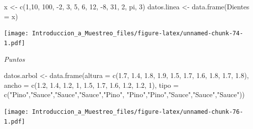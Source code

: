\documentclass[
]{book}
\newenvironment{Shaded}{\begin{snugshade}}{\end{snugshade}}
\newcommand{\AttributeTok}[1]{\textcolor[rgb]{0.77,0.63,0.00}{#1}}
\newcommand{\DecValTok}[1]{\textcolor[rgb]{0.00,0.00,0.81}{#1}}
\newcommand{\FloatTok}[1]{\textcolor[rgb]{0.00,0.00,0.81}{#1}}
\newcommand{\FunctionTok}[1]{\textcolor[rgb]{0.00,0.00,0.00}{#1}}
\newcommand{\NormalTok}[1]{#1}
\newcommand{\OtherTok}[1]{\textcolor[rgb]{0.56,0.35,0.01}{#1}}
\newcommand{\SpecialCharTok}[1]{\textcolor[rgb]{0.00,0.00,0.00}{#1}}
\newcommand{\StringTok}[1]{\textcolor[rgb]{0.31,0.60,0.02}{#1}}
\begin{document}
\begin{Shaded}
\begin{Highlighting}[]
\NormalTok{x }\OtherTok{\textless{}{-}} \FunctionTok{c}\NormalTok{(}\DecValTok{1}\NormalTok{,}\DecValTok{10}\NormalTok{, }\DecValTok{100}\NormalTok{, }\SpecialCharTok{{-}}\DecValTok{2}\NormalTok{, }\DecValTok{3}\NormalTok{, }\DecValTok{5}\NormalTok{, }\DecValTok{6}\NormalTok{, }\DecValTok{12}\NormalTok{, }\SpecialCharTok{{-}}\DecValTok{8}\NormalTok{, }\DecValTok{31}\NormalTok{, }\DecValTok{2}\NormalTok{, pi, }\DecValTok{3}\NormalTok{)}
\NormalTok{datos.linea }\OtherTok{\textless{}{-}} \FunctionTok{data.frame}\NormalTok{(}\AttributeTok{Dientes =}\NormalTok{ x)}
\end{Highlighting}
\end{Shaded}

\texttt{[image: Introduccion\_a\_Muestreo\_files/figure-latex/unnamed-chunk-74-1.pdf]}

\emph{Puntos}

\begin{Shaded}
\begin{Highlighting}[]
\NormalTok{datos.arbol }\OtherTok{\textless{}{-}} \FunctionTok{data.frame}\NormalTok{(}\AttributeTok{altura =} \FunctionTok{c}\NormalTok{(}\FloatTok{1.7}\NormalTok{, }\FloatTok{1.4}\NormalTok{, }\FloatTok{1.8}\NormalTok{, }\FloatTok{1.9}\NormalTok{, }\FloatTok{1.5}\NormalTok{, }\FloatTok{1.7}\NormalTok{,}
                                     \FloatTok{1.6}\NormalTok{, }\FloatTok{1.8}\NormalTok{, }\FloatTok{1.7}\NormalTok{, }\FloatTok{1.8}\NormalTok{),}
                          \AttributeTok{ancho =} \FunctionTok{c}\NormalTok{(}\FloatTok{1.2}\NormalTok{, }\FloatTok{1.4}\NormalTok{, }\FloatTok{1.2}\NormalTok{, }\DecValTok{1}\NormalTok{, }\FloatTok{1.5}\NormalTok{, }\FloatTok{1.7}\NormalTok{, }\FloatTok{1.6}\NormalTok{,}
                                    \FloatTok{1.2}\NormalTok{, }\FloatTok{1.2}\NormalTok{, }\DecValTok{1}\NormalTok{),}
                          \AttributeTok{tipo =} \FunctionTok{c}\NormalTok{(}\StringTok{"Pino"}\NormalTok{,}\StringTok{"Sauce"}\NormalTok{,}\StringTok{"Sauce"}\NormalTok{,}\StringTok{"Sauce"}\NormalTok{,}\StringTok{"Pino"}\NormalTok{,}
                                   \StringTok{"Pino"}\NormalTok{,}\StringTok{"Pino"}\NormalTok{,}\StringTok{"Sauce"}\NormalTok{,}\StringTok{"Sauce"}\NormalTok{,}\StringTok{"Sauce"}\NormalTok{))}
\end{Highlighting}
\end{Shaded}

\texttt{[image: Introduccion\_a\_Muestreo\_files/figure-latex/unnamed-chunk-76-1.pdf]}
\end{document}
